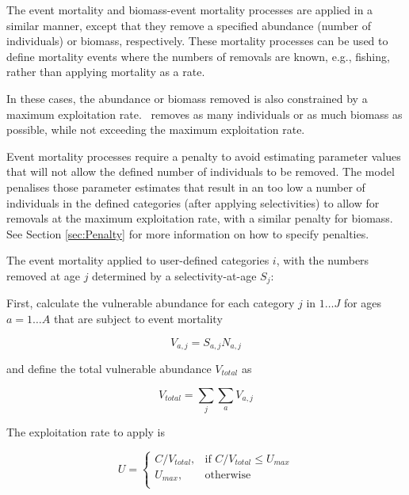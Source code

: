 
The event mortality and biomass-event mortality processes are applied in a similar manner, except that they remove a specified abundance (number of individuals) or biomass, respectively. These mortality processes can be used to define mortality events where the numbers of removals are known, e.g., fishing, rather than applying mortality as a rate.

In these cases, the abundance or biomass removed is also constrained by a maximum exploitation rate. \CNAME\ removes as many individuals or as much biomass as possible,  while not exceeding the maximum exploitation rate.

Event mortality processes require a penalty to avoid estimating parameter values that will not allow the defined number of individuals to be removed. The model penalises those parameter estimates that result in an too low a number of individuals in the defined categories (after applying selectivities) to allow for removals at the maximum exploitation rate, with a similar penalty for biomass. See Section \ref{sec:Penalty} for more information on how to specify penalties.

The event mortality applied to user-defined categories $i$, with the numbers removed at age $j$ determined by a selectivity-at-age $S_j$:

First, calculate the vulnerable abundance for each category $j$ in $1 \ldots J$ for ages $a = 1 \ldots A$ that are subject to event mortality

\begin{equation}
  V_{a,j} = S_{a,j} N_{a,j}
\end{equation}

and define the total vulnerable abundance $V_{total}$ as

\begin{equation}
  V_{total}  = \sum\limits_j {\sum\limits_a {V_{a,j}}}
\end{equation}

The exploitation rate to apply is

\begin{equation}
U = \begin{cases}
  C/V_{total}, & \text{if $C/V_{total} \leq U_{max}$} \\
  U_{max}, & \text{otherwise}\\
  \end{cases}
\end{equation}

